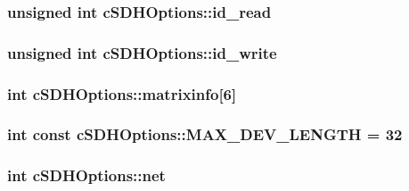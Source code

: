 \hypertarget{classcSDHOptions_a301e3d6b905c010e82a45420f5cd5634}{
\subsubsection[{id\-\_\-read}]{\setlength{\rightskip}{0pt plus 5cm}unsigned int {\bf c\-S\-D\-H\-Options\-::id\-\_\-read}}}\label{classcSDHOptions_a301e3d6b905c010e82a45420f5cd5634}
\hypertarget{classcSDHOptions_a3ca7757c9dbb11c190987992582132ab}{
\subsubsection[{id\-\_\-write}]{\setlength{\rightskip}{0pt plus 5cm}unsigned int {\bf c\-S\-D\-H\-Options\-::id\-\_\-write}}}\label{classcSDHOptions_a3ca7757c9dbb11c190987992582132ab}
\hypertarget{classcSDHOptions_a3dcaa4689b89c3f480cad4744a72c0f8}{
\subsubsection[{matrixinfo}]{\setlength{\rightskip}{0pt plus 5cm}int {\bf c\-S\-D\-H\-Options\-::matrixinfo}\mbox{[}6\mbox{]}}}\label{classcSDHOptions_a3dcaa4689b89c3f480cad4744a72c0f8}
\hypertarget{classcSDHOptions_a9caeb9858b718ed48145a833be2c9178}{
\subsubsection[{\-M\-A\-X\-\_\-\-D\-E\-V\-\_\-\-L\-E\-N\-G\-T\-H}]{\setlength{\rightskip}{0pt plus 5cm}int const {\bf c\-S\-D\-H\-Options\-::\-M\-A\-X\-\_\-\-D\-E\-V\-\_\-\-L\-E\-N\-G\-T\-H} = 32}}\label{classcSDHOptions_a9caeb9858b718ed48145a833be2c9178}
\hypertarget{classcSDHOptions_adefa363d3e2c61e37676037a09faaf06}{
\subsubsection[{net}]{\setlength{\rightskip}{0pt plus 5cm}int {\bf c\-S\-D\-H\-Options\-::net}}}\label{classcSDHOptions_adefa363d3e2c61e37676037a09faaf06}

